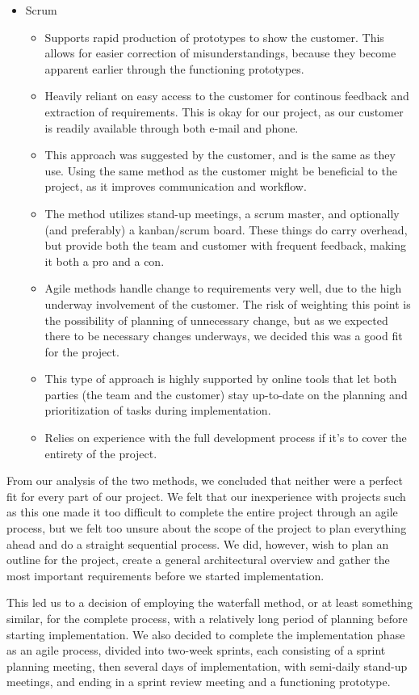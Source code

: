 \begin{itemize}
	\item Scrum
	\begin{itemize}
		\item Supports rapid production of prototypes to show the customer. This allows for easier correction of misunderstandings, because they become apparent earlier through the functioning prototypes.
		\item Heavily reliant on easy access to the customer for continous feedback and extraction of requirements. This is okay for our project, as our customer is readily available through both e-mail and phone.
		\item This approach was suggested by the customer, and is the same as they use. Using the same method as the customer might be beneficial to the project, as it improves communication and workflow.
		\item The method utilizes stand-up meetings, a scrum master, and optionally (and preferably) a kanban/scrum board. These things do carry overhead, but provide both the team and customer with frequent feedback, making it both a pro and a con.
		\item Agile methods handle change to requirements very well, due to the high underway involvement of the customer. The risk of weighting this point is the possibility of planning of unnecessary change, but as we expected there to be necessary changes underways, we decided this was a good fit for the project.
		\item This type of approach is highly supported by online tools that let both parties (the team and the customer) stay up-to-date on the planning and prioritization of tasks during implementation.
		\item Relies on experience with the full development process if it’s to cover the entirety of the project.
	\end{itemize}
\end{itemize}
From our analysis of the two methods, we concluded that neither were a perfect fit for every part of our project. We felt that our inexperience with projects such as this one made it too difficult to complete the entire project through an agile process, but we felt too unsure about the scope of the project to plan everything ahead and do a straight sequential process. We did, however, wish to plan an outline for the project, create a general architectural overview and gather the most important requirements before we started implementation.

This led us to a decision of employing the waterfall method, or at least something similar, for the complete process, with a relatively long period of planning before starting implementation. We also decided to complete the implementation phase as an agile process, divided into two-week sprints, each consisting of a sprint planning meeting, then several days of implementation, with semi-daily stand-up meetings, and ending in a sprint review meeting and a functioning prototype.